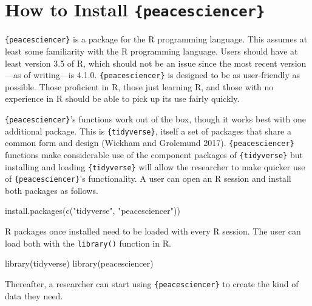 \documentclass[
  11pt,
]{article}
\newenvironment{Shaded}{\begin{snugshade}}{\end{snugshade}}
\newcommand{\FunctionTok}[1]{\textcolor[rgb]{0.00,0.00,0.00}{#1}}
\newcommand{\NormalTok}[1]{#1}
\newcommand{\StringTok}[1]{\textcolor[rgb]{0.31,0.60,0.02}{#1}}
\begin{document}
\hypertarget{how-to-install-peacesciencer}{%
\section{\texorpdfstring{How to Install \texttt{\{peacesciencer\}}}{How to Install \{peacesciencer\}}}\label{how-to-install-peacesciencer}}

\texttt{\{peacesciencer\}} is a package for the R programming language. This assumes at least some familiarity with the R programming language. Users should have at least version 3.5 of R, which should not be an issue since the most recent version---as of writing---is 4.1.0. \texttt{\{peacesciencer\}} is designed to be as user-friendly as possible. Those proficient in R, those just learning R, and those with no experience in R should be able to pick up its use fairly quickly.

\texttt{\{peacesciencer\}}'s functions work out of the box, though it works best with one additional package. This is \texttt{\{tidyverse\}}, itself a set of packages that share a common form and design (Wickham and Grolemund 2017). \texttt{\{peacesciencer\}} functions make considerable use of the component packages of \texttt{\{tidyverse\}} but installing and loading \texttt{\{tidyverse\}} will allow the researcher to make quicker use of \texttt{\{peacesciencer\}}'s functionality. A user can open an R session and install both packages as follows.

\begin{Shaded}
\begin{Highlighting}[]
\FunctionTok{install.packages}\NormalTok{(}\FunctionTok{c}\NormalTok{(}\StringTok{"tidyverse"}\NormalTok{, }\StringTok{"peacesciencer"}\NormalTok{))}
\end{Highlighting}
\end{Shaded}

R packages once installed need to be loaded with every R session. The user can load both with the \texttt{library()} function in R.

\begin{Shaded}
\begin{Highlighting}[]
\FunctionTok{library}\NormalTok{(tidyverse)}
\FunctionTok{library}\NormalTok{(peacesciencer)}
\end{Highlighting}
\end{Shaded}

Thereafter, a researcher can start using \texttt{\{peacesciencer\}} to create the kind of data they need.
\end{document}
